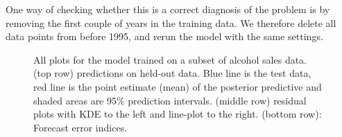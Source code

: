\documentclass{article}
\begin{document}
One way of checking whether this is a correct diagnosis of the problem is by removing the first couple of years in the training data. We therefore delete all data points from before 1995, and rerun the model with the same settings.


\begin{figure}[H]
    \centering
    \quad
    \quad
    \caption{All plots for the model trained on a subset of alcohol sales data. (top row) predictions on held-out data. Blue line is the test data, red line is the point estimate (mean) of the posterior predictive and shaded areas are 95\% prediction intervals. (middle row) residual plots with KDE to the left and line-plot to the right. (bottom row): Forecast error indices. }
\end{figure}
\end{document}
